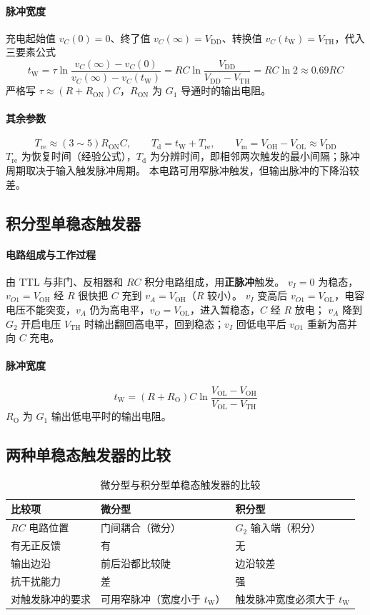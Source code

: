 \paragraph{脉冲宽度}
充电起始值 $v_C(0)=0$、终了值 $v_C(\infty)=V_\text{DD}$、转换值 $v_C(t_\text{W})=V_\text{TH}$，代入三要素公式
\[
t_\text{W}=\tau\ln\frac{v_C(\infty)-v_C(0)}{v_C(\infty)-v_C(t_\text{W})}
=RC\ln\frac{V_\text{DD}}{V_\text{DD}-V_\text{TH}}=RC\ln2\approx0.69RC
\]
严格写 $\tau\approx(R+R_\text{ON})C$，$R_\text{ON}$ 为 $G_1$ 导通时的输出电阻。

\paragraph{其余参数}
\[
T_\text{re}\approx(3\sim5)R_\text{ON}C,\qquad T_\text{d}=t_\text{W}+T_\text{re},\qquad V_\text{m}=V_\text{OH}-V_\text{OL}\approx V_\text{DD}
\]
$T_\text{re}$ 为恢复时间（经验公式），$T_\text{d}$ 为分辨时间，即相邻两次触发的最小间隔；脉冲周期取决于输入触发脉冲周期。
本电路可用窄脉冲触发，但输出脉冲的下降沿较差。

\subsection{积分型单稳态触发器}
\paragraph{电路组成与工作过程}
由 TTL 与非门、反相器和 $RC$ 积分电路组成，用\textbf{正脉冲}触发。
$v_I=0$ 为稳态，$v_{O1}=V_\text{OH}$ 经 $R$ 很快把 $C$ 充到 $v_A=V_\text{OH}$（$R$ 较小）。
$v_I$ 变高后 $v_{O1}=V_\text{OL}$，电容电压不能突变，$v_A$ 仍为高电平，$v_O=V_\text{OL}$，进入暂稳态，$C$ 经 $R$ 放电；
$v_A$ 降到 $G_2$ 开启电压 $V_\text{TH}$ 时输出翻回高电平，回到稳态；$v_I$ 回低电平后 $v_{O1}$ 重新为高并向 $C$ 充电。

\paragraph{脉冲宽度}
\[
t_\text{W}=(R+R_\text{O})C\ln\frac{V_\text{OL}-V_\text{OH}}{V_\text{OL}-V_\text{TH}}
\]
$R_\text{O}$ 为 $G_1$ 输出低电平时的输出电阻。

\subsection{两种单稳态触发器的比较}
\begin{table}[htbp]
\centering
\caption{微分型与积分型单稳态触发器的比较}
\begin{tabular}{lll}
\toprule
比较项 & 微分型 & 积分型 \\
\midrule
$RC$ 电路位置 & 门间耦合（微分） & $G_2$ 输入端（积分） \\
有无正反馈 & 有 & 无 \\
输出边沿 & 前后沿都比较陡 & 边沿较差 \\
抗干扰能力 & 差 & 强 \\
对触发脉冲的要求 & 可用窄脉冲（宽度小于 $t_\text{W}$） & 触发脉冲宽度必须大于 $t_\text{W}$ \\
\bottomrule
\end{tabular}
\end{table}

